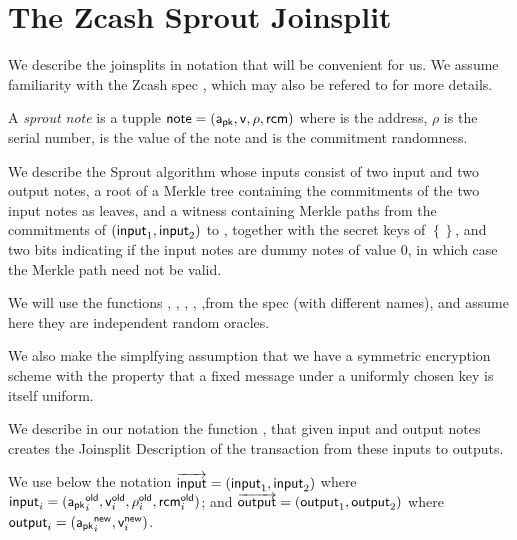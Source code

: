 \documentclass[11pt]{article}
\numberwithin{equation}{section} %
\numberwithin{figure}{section} %
\newcommand{\inp}{\ensuremath{\mathsf{inp}}\xspace}
\newcommand{\set}[1]{\ensuremath{\left\{#1\right\}}\xspace}
\begin{document}
\section{The Zcash Sprout Joinsplit}
We describe the joinsplits in notation that will be convenient for us. We assume familiarity with the Zcash spec \cite{spec}, which may also be refered to for more details.


A \emph{sprout note \note} is a tupple $\mathsf{note}=(\mathsf{a_{pk}},\mathsf{v},\rho,\mathsf{rcm})$ where \apk is the address, $\rho$ is the serial number, \val is the value of the note 
and \rcm is the commitment randomness.



We describe the Sprout \makejsd algorithm whose inputs consist of two input and two output notes, a root of a Merkle tree \rt containing the commitments of the two input notes as leaves, and a witness \wit containing Merkle paths from the commitments of $(\mathsf{input}_1,\mathsf{input}_2)$ to \rt, together with the secret keys 
\old{\ask} of \set{}, and two bits indicating if the input notes are dummy notes of value 0, in which case the Merkle path need not be valid.

We will use the functions \notecom, \NF, \PK, \RHO, \addr,\KDF from the spec (with different names), and assume here they are independent random oracles.

We also make the simplfying assumption that we have a symmetric encryption scheme with the property that a fixed message under a uniformly chosen key is itself uniform.

We describe in our notation the function \makejsd, that given input and output notes creates the Joinsplit Description of the transaction from
these inputs to outputs.
% 

We use below the notation $\overrightarrow{\mathsf{input}}=(\mathsf{input}_1,\mathsf{input}_2)$
where $\mathsf{input}_i = (\mathsf{a_{pk}}_i^{\mathsf{old}},\mathsf{v}_i^{\mathsf{old}},\rho_i^{\mathsf{old}},\mathsf{rcm}_i^{\mathsf{old}})$;
and $\overrightarrow{\mathsf{output}} = (\mathsf{output}_1,\mathsf{output}_2)$ where
$\mathsf{output}_i = (\mathsf{a_{pk}}_i^{\mathsf{new}},\mathsf{v}_i^{\mathsf{new}})$.
\end{document}
